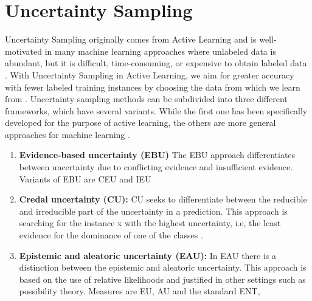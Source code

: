 \section{Uncertainty Sampling}
Uncertainty Sampling originally comes from Active Learning and is well-motivated in many machine learning approaches where unlabeled data is abundant, but it is difficult, time-consuming, or expensive to obtain labeled data \cite{Settles2009ActiveLL}.
With Uncertainty Sampling in Active Learning, we aim for greater accuracy with fewer labeled training instances by choosing the data from which we learn from \cite{Settles2009ActiveLL}.
Uncertainty sampling methods can be subdivided into three different frameworks, which have several variants.
While the first one has been specifically developed for the purpose of active learning, the others are more general approaches for machine learning \cite{nguyen2021howtomeasure}.
\begin{enumerate}
    \item 
    \textbf{Evidence-based uncertainty (EBU)}
    The \ac{EBU} approach differentiates between uncertainty due to conflicting evidence and insufficient evidence.
    Variants of \ac{EBU} are \ac{CEU} and \ac{IEU}

    \item 
    \textbf{Credal uncertainty (CU):}
    \ac{CU} seeks to differentiate between the reducible and irreducible part of the uncertainty in a prediction.
    This approach is searching for the instance x with the highest uncertainty, i.e, the least evidence for the dominance of one of the classes \cite{nguyen2021howtomeasure}.

    \item 
    \textbf{Epistemic and aleatoric uncertainty (EAU):}
    In \ac{EAU} there is a distinction between the epistemic and aleatoric uncertainty. This approach is based on the use of relative likelihoods and justified in other settings such as possibility theory. 
    Measures are \ac{EU}, \ac{AU} and the standard \ac{ENT}, 
\end{enumerate}






